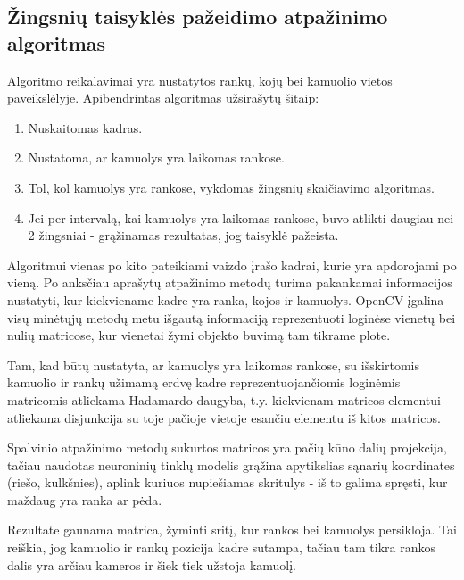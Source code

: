 \documentclass{VUMIFPSbakalaurinis}
\begin{document}
\subsection{Žingsnių taisyklės pažeidimo atpažinimo algoritmas}

Algoritmo reikalavimai yra nustatytos rankų, kojų bei kamuolio vietos paveikslėlyje. Apibendrintas algoritmas užsirašytų šitaip: 

\begin{enumerate}
	\item Nuskaitomas kadras.
	\item Nustatoma, ar kamuolys yra laikomas rankose.
	\item Tol, kol kamuolys yra rankose, vykdomas žingsnių skaičiavimo algoritmas.
	\item Jei per intervalą, kai kamuolys yra laikomas rankose, buvo atlikti daugiau nei 2 žingsniai - grąžinamas rezultatas, jog taisyklė pažeista.
\end{enumerate}

Algoritmui vienas po kito pateikiami vaizdo įrašo kadrai, kurie yra apdorojami po vieną. Po anksčiau aprašytų atpažinimo metodų turima pakankamai informacijos nustatyti, kur kiekviename kadre yra ranka, kojos ir kamuolys. OpenCV įgalina visų minėtųjų metodų metu išgautą informaciją reprezentuoti loginėse vienetų bei nulių matricose, kur vienetai žymi objekto buvimą tam tikrame plote. 

Tam, kad būtų nustatyta, ar kamuolys yra laikomas rankose, su išskirtomis kamuolio ir rankų užimamą erdvę kadre reprezentuojančiomis loginėmis matricomis atliekama Hadamardo daugyba, t.y. kiekvienam matricos elementui atliekama disjunkcija su toje pačioje vietoje esančiu elementu iš kitos matricos.

Spalvinio atpažinimo metodų sukurtos matricos yra pačių kūno dalių projekcija, tačiau naudotas neuroninių tinklų modelis grąžina apytikslias sąnarių koordinates (riešo, kulkšnies), aplink kuriuos nupiešiamas skritulys - iš to galima spręsti, kur maždaug yra ranka ar pėda.  

Rezultate gaunama matrica, žyminti sritį, kur rankos bei kamuolys persikloja. Tai reiškia, jog kamuolio ir rankų pozicija kadre sutampa, tačiau tam tikra rankos dalis yra arčiau kameros ir šiek tiek užstoja kamuolį. 
\end{document}
